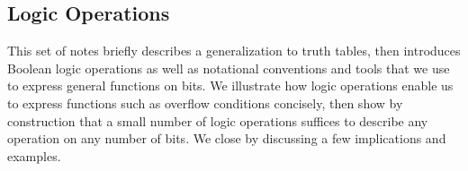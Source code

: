 \classtitle

\subsection{Logic Operations}

% 
% 
% 
% 
% 
% 
% 

This set of notes briefly describes a generalization to truth tables,
then introduces Boolean logic operations as well as 
notational conventions and tools that we use to express general
functions on bits.  We illustrate how logic operations enable 
us to express functions such as overflow conditions concisely,
then show by construction that a small number of logic operations
suffices to describe any operation on any number of bits.  
We close by discussing a few implications and examples.\\


